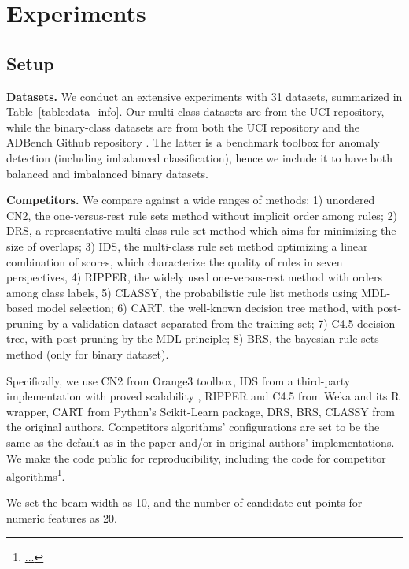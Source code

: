  
\section{Experiments}
\subsection{Setup}
\textbf{Datasets.} We conduct an extensive experiments with 31 datasets, summarized in Table~\ref{table:data_info}. Our multi-class datasets are from the UCI repository, while the binary-class datasets are from both the UCI repository and the ADBench Github repository \citep{han2022adbench}. The latter is a benchmark toolbox for anomaly detection (including imbalanced classification), hence we include it to have both balanced and imbalanced binary datasets.

\noindent
\textbf{Competitors.} We compare against a wide ranges of methods: 1) unordered CN2, the one-versus-rest rule sets method without implicit order among rules; 2) DRS, a representative multi-class rule set method which aims for minimizing the size of overlaps; 3) IDS, the multi-class rule set method optimizing a linear combination of scores, which characterize the quality of rules in seven perspectives, 4) RIPPER, the widely used one-versus-rest method with orders among class labels, 5) CLASSY, the probabilistic rule list methods using MDL-based model selection; 6) CART, the well-known decision tree method, with post-pruning by a validation dataset separated from the training set; 7) C4.5 decision tree, with post-pruning by the MDL principle; 8) BRS, the bayesian rule sets method (only for binary dataset). 

Specifically, we use CN2 from Orange3 toolbox, IDS from a third-party implementation with proved scalability \citep{filip2019pyids}, RIPPER and C4.5 from Weka and its R wrapper, CART from Python's Scikit-Learn package, DRS, BRS, CLASSY from the original authors. Competitors algorithms' configurations are set to be the same as the default as in the paper and/or in original authors' implementations. We make the code public for reproducibility, including the code for competitor algorithms\footnote{\url{...}}.


 We set the beam width as 10, and the number of candidate cut points for numeric features as 20. 



